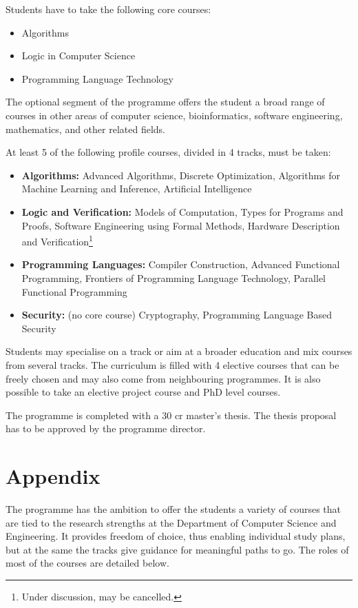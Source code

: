 \documentclass[twocolumn]{article}
\begin{document}
Students have to take the following core courses:
\begin{itemize}
\item Algorithms
\item Logic in Computer Science
\item Programming Language Technology
\end{itemize}

The optional segment of the programme offers the student a broad range
of courses in other areas of computer science, bioinformatics,
software engineering, mathematics, and other related fields.

At least 5 of the following profile courses, divided in 4 tracks, must
be taken:

\begin{itemize}
\item {\bf Algorithms:} Advanced Algorithms, Discrete Optimization,
  Algorithms for Machine Learning and Inference, Artificial
  Intelligence
\item {\bf Logic and Verification:} Models of Computation, Types for
  Programs and Proofs, Software Engineering using Formal Methods,
  Hardware Description and Verification\footnote{Under discussion, may
    be cancelled.}
\item {\bf Programming Languages:} Compiler Construction, Advanced
  Functional Programming, Frontiers of Programming Language
  Technology, Parallel Functional Programming
\item {\bf Security:} (no core course) Cryptography, Programming
  Language Based Security
\end{itemize}

Students may specialise on a track or aim at a broader education and
mix courses from several tracks. The curriculum is filled with 4
elective courses that can be freely chosen and may also come from
neighbouring programmes. It is also possible to take an elective project
course and PhD level courses.

The programme is completed with a 30 cr master's thesis. The
thesis proposal has to be approved by the programme director.

\section*{Appendix}

The programme has the ambition to offer the students a variety of
courses that are tied to the research strengths at the Department of
Computer Science and Engineering. It provides freedom of choice, thus
enabling individual study plans, but at the same the tracks give
guidance for meaningful paths to go.  The roles of most of the courses
are detailed below.
\end{document}
